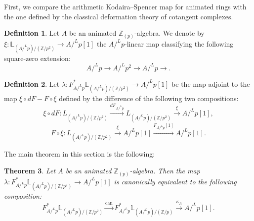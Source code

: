 \documentclass[11pt, a4paper]{amsart}
\theoremstyle{plain}
\newtheorem{theorem}{Theorem}[section]
\theoremstyle{definition}
\newtheorem{definition}[theorem]{Definition}
\begin{document}
First, we compare the arithmetic Kodaira--Spencer map for animated rings with the one defined by the classical deformation theory of cotangent complexes.

\begin{definition}\label{Def5.2}
Let $A$ be an animated $\mathbb Z_{(p)}$-algebra. We denote by $\xi:\mathbb L_{(A/^Lp)/(\mathbb Z/p^2)}\to A/^Lp[1]$ the $A/^Lp$-linear map classifying the following square-zero extension:\[A/^Lp\to A/^Lp^2\to A/^Lp\to .\] 
\end{definition}

\begin{definition}\label{Def5.3}
    Let $\lambda:F^*_{A/^Lp}\mathbb L_{(A/^Lp)/(\mathbb Z/p^2)}\to A/^Lp[1]$ be the map adjoint to the map $\xi\circ dF-F\circ \xi$ defined by the difference of the following two compositions:\[\xi\circ dF:L_{(A/^Lp)/(\mathbb Z/p^2)}\xrightarrow[]{dF_{A/^Lp}}L_{(A/^Lp)/(\mathbb Z/p^2)}\xrightarrow[]{\xi}A/^Lp[1],\]
    \[F\circ \xi:L_{(A/^Lp)/(\mathbb Z/p^2)}\xrightarrow[]{\xi}A/^Lp[1]\xrightarrow[]{F_{A/^Lp}[1]}A/^Lp[1].\]
\end{definition}
The main theorem in this section is the following:
\begin{theorem}\label{thm5.4}
    Let $A$ be an animated $\mathbb Z_{(p)}$-algebra. Then the map $\lambda:F^*_{A/^Lp}\mathbb L_{(A/^Lp)/(\mathbb Z/p^2)}\to A/^Lp[1]$ is canonically equivalent to the following composition:\[F^*_{A/^Lp}\mathbb L_{(A/^Lp)/(\mathbb Z/p^2)}\xrightarrow[]{\mathrm{can}} F^*_{A/^Lp}\mathbb L_{(A/^Lp)/(\mathbb Z/p)}\xrightarrow[]{\kappa_A} A/^Lp[1].\]
\end{theorem}
\end{document}
